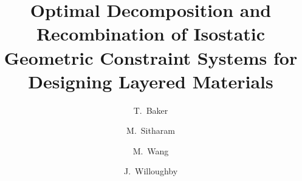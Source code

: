 \documentclass[3p]{elsarticle}
\begin{document}
\begin{frontmatter}
%
%

\title{Optimal Decomposition and Recombination of Isostatic Geometric Constraint Systems for Designing Layered Materials}

%
%

%
%


\author[uf]{T.~Baker}

\author[uf]{M.~Sitharam}

\author[uf]{M.~Wang}

\author[uf]{J.~Willoughby}


\address[uf]{University of Florida, CSE Building, Gainesville, Florida, U.S.A., 32611}


%
%











%
%



\end{frontmatter}
\end{document}
